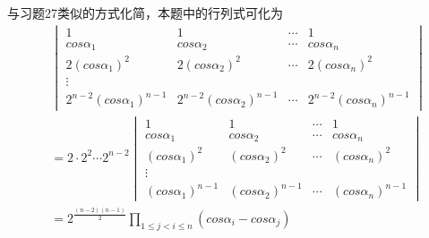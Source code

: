 \documentclass{article}
\begin{document}
与习题27类似的方式化简，本题中的行列式可化为
\begin{align*}
   & \begin{vmatrix}
       1                               & 1                               & \cdots & 1                               \\
       cos\alpha_1                     & cos\alpha_2                     & \cdots & cos\alpha_n                     \\
       2 (cos\alpha_1)^2               & 2 (cos\alpha_2)^2               & \cdots & 2 (cos\alpha_n)^2               \\
       \vdots                                                                                                       \\
       2^{n - 2} (cos\alpha_1)^{n - 1} & 2^{n - 2} (cos\alpha_2)^{n - 1} & \cdots & 2^{n - 2} (cos\alpha_n)^{n - 1}
     \end{vmatrix} \\
   & = 2 \cdot 2^{2} \cdots 2^{n - 2}
  \begin{vmatrix}
    1                     & 1                     & \cdots & 1                     \\
    cos\alpha_1           & cos\alpha_2           & \cdots & cos\alpha_n           \\
    (cos\alpha_1)^2       & (cos\alpha_2)^2       & \cdots & (cos\alpha_n)^2       \\
    \vdots                                                                         \\
    (cos\alpha_1)^{n - 1} & (cos\alpha_2)^{n - 1} & \cdots & (cos\alpha_n)^{n - 1}
  \end{vmatrix}                                  \\
   & = 2^{\frac{(n-2)(n-1)}{2}} \prod \limits_{1 \leq j < i \leq n} (cos\alpha_i - cos\alpha_j)
\end{align*}
\end{document}
